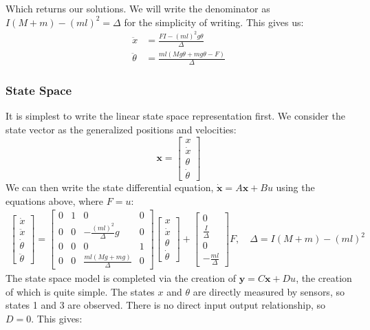 Which returns our solutions. We will write the denominator as $I(M+m)-(ml)^2=\Delta$ for the simplicity of writing. This gives us:
\begin{align}
    \ddot{x}&=\frac{FI-\left(ml\right)^2g\theta}{\Delta}\\
    \ddot{\theta}&=\frac{ml(Mg\theta+mg\theta-F)}{\Delta}
\end{align}

\subsubsection{State Space}
It is simplest to write the linear state space representation first. We consider the state vector as the generalized positions and velocities:
$$\bm{x}=\begin{bmatrix}
    x\\\dot{x}\\\theta\\\dot{\theta}
\end{bmatrix}$$
We can then write the state differential equation, $\dot{\bm{x}}=A\bm{x}+Bu$ using the equations above, where $F=u$:
\begin{gather}
    \begin{bmatrix}
    \dot x\\\ddot{x}\\\dot\theta\\\ddot{\theta}
\end{bmatrix}=\begin{bmatrix}
    0&1&0&0\\0&0&-\frac{(ml)^2}{\Delta}g&0\\
    0&0&0&1\\0&0&\frac{ml\left(Mg+mg\right)}{\Delta}&0
\end{bmatrix}\begin{bmatrix}
      x\\\dot{x}\\\theta\\\dot{\theta}
\end{bmatrix}+\begin{bmatrix}
    0\\\frac{I}{\Delta}\\0\\-\frac {ml}{\Delta}
\end{bmatrix}F,\quad\Delta=I(M+m)-(ml)^2
\end{gather}
The state space model is completed via the creation of $\bm{y}=C\bm{x}+Du$, the creation of which is quite simple. The states $x$ and $\theta$ are directly measured by sensors, so states 1 and 3 are observed. There is no direct input output relationship, so $D=0$. This gives:
